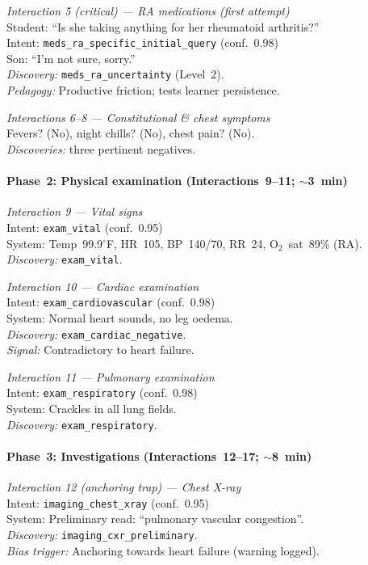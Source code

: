 \smallskip
\textit{Interaction 5 (critical) --- RA medications (first attempt)} \\
Student: ``Is she taking anything for her rheumatoid arthritis?'' \\
Intent: \texttt{meds\_ra\_specific\_initial\_query} (conf.~0.98) \\
Son: ``I'm not sure, sorry.'' \\
\emph{Discovery:} \texttt{meds\_ra\_uncertainty} (Level~2). \\
\emph{Pedagogy:} Productive friction; tests learner persistence.

\smallskip
\textit{Interactions 6--8 --- Constitutional \& chest symptoms} \\
Fevers? (No), night chills? (No), chest pain? (No). \\
\emph{Discoveries:} three pertinent negatives.

\paragraph{Phase~2: Physical examination (Interactions~9--11; \(\sim\)3~min)}
\textit{Interaction 9 --- Vital signs} \\
Intent: \texttt{exam\_vital} (conf.~0.95) \\
System: Temp~99.9$^\circ$F, HR~105, BP~140/70, RR~24, O$_2$~sat~89\% (RA). \\
\emph{Discovery:} \texttt{exam\_vital}.

\smallskip
\textit{Interaction 10 --- Cardiac examination} \\
Intent: \texttt{exam\_cardiovascular} (conf.~0.98) \\
System: Normal heart sounds, no leg oedema. \\
\emph{Discovery:} \texttt{exam\_cardiac\_negative}. \\
\emph{Signal:} Contradictory to heart failure.

\smallskip
\textit{Interaction 11 --- Pulmonary examination} \\
Intent: \texttt{exam\_respiratory} (conf.~0.98) \\
System: Crackles in all lung fields. \\
\emph{Discovery:} \texttt{exam\_respiratory}.

\paragraph{Phase~3: Investigations (Interactions~12--17; \(\sim\)8~min)}
\textit{Interaction 12 (anchoring trap) --- Chest X-ray} \\
Intent: \texttt{imaging\_chest\_xray} (conf.~0.95) \\
System: Preliminary read: ``pulmonary vascular congestion''. \\
\emph{Discovery:} \texttt{imaging\_cxr\_preliminary}. \\
\emph{Bias trigger:} Anchoring towards heart failure (warning logged).


